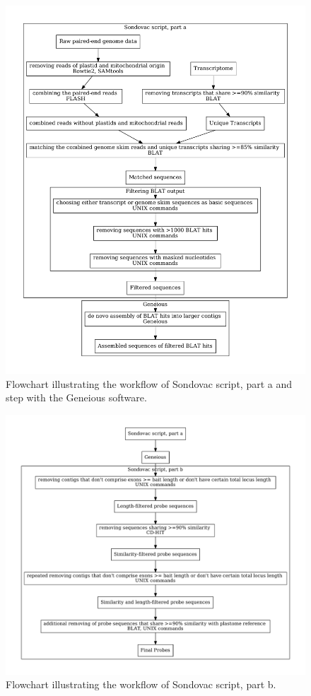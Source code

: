 \begin{figure}
\centerline{
	\includegraphics[width=1\textwidth]{graphs/sondovac_overview}
}
\caption[Sondovac pipeline workflow]{Flowchart illustrating the workflow of Sondovac script, part a and step with the Geneious software.}
\label{obr:workflowa}
\end{figure}

\begin{figure}
\centerline{
	\includegraphics[width=1\textwidth]{graphs/sondovac_overview_part_b}
}
\caption[Sondovac pipeline workflow -- part b]{Flowchart illustrating the workflow of Sondovac script, part b.}
\label{obr:workflowb}
\end{figure}


